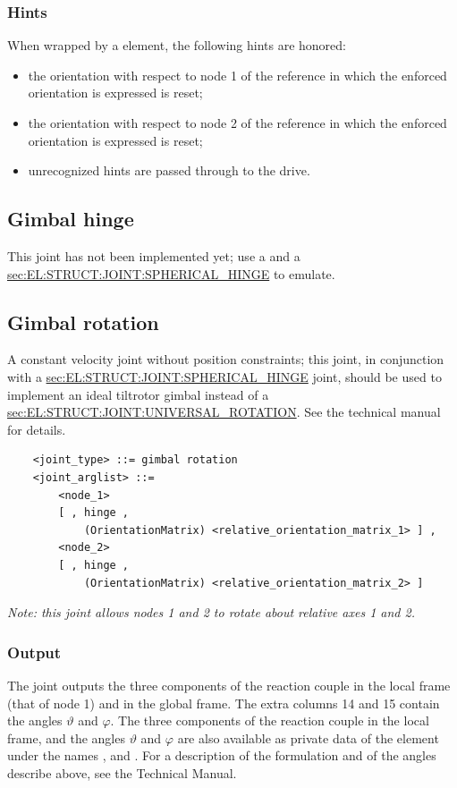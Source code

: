 \subsubsection{Hints}
When wrapped by a  element, the following hints are honored:
\begin{itemize}
\item {} the orientation with respect to node 1
of the reference in which the enforced orientation is expressed is reset;
\item {} the orientation with respect to node 2
of the reference in which the enforced orientation is expressed is reset;
\item unrecognized hints are passed through to the  drive.
\end{itemize}

\subsection{Gimbal hinge}
This joint has not been implemented yet; use a 
and a
\hyperref{\kw{spherical hinge}}{\kw{spherical hinge} (see Section~}{)}{sec:EL:STRUCT:JOINT:SPHERICAL_HINGE}
to emulate.

\subsection{Gimbal rotation}\label{sec:EL:JOINT:GIMBALROTATION}
A constant velocity joint without position constraints;
this joint, in conjunction with a
\hyperref{\kw{spherical hinge}}{\kw{spherical hinge} (see Section~}{)}{sec:EL:STRUCT:JOINT:SPHERICAL_HINGE}
joint, should be used to implement an ideal tiltrotor gimbal
instead of a
\hyperref{\kw{universal rotation}}{\kw{universal rotation} (see Section~}{)}{sec:EL:STRUCT:JOINT:UNIVERSAL_ROTATION}.
See the technical manual for details.
\begin{verbatim}
    <joint_type> ::= gimbal rotation
    <joint_arglist> ::= 
        <node_1>
        [ , hinge , 
            (OrientationMatrix) <relative_orientation_matrix_1> ] ,
        <node_2>
        [ , hinge , 
            (OrientationMatrix) <relative_orientation_matrix_2> ]
\end{verbatim}
{\em
    Note: this joint allows nodes 1 and 2 to rotate about relative 
    axes 1 and 2.
}

\subsubsection{Output}
The  joint outputs the three components
of the reaction couple in the local frame (that of node 1) 
and in the global frame.
The extra columns 14 and 15 contain the angles $\vartheta$ and $\varphi$.
The three components of the reaction couple in the local frame, 
and the angles $\vartheta$ and $\varphi$ are also available
as private data of the element under the names ,
 and .
For a description of the formulation and of the angles describe above,
see the Technical Manual.

